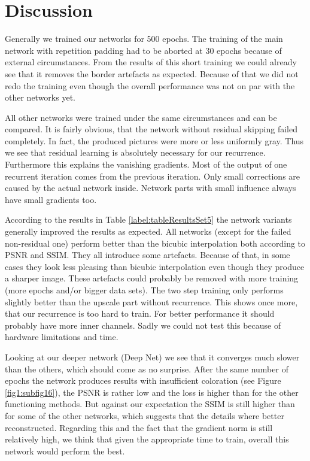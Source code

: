 \documentclass[11pt]{article}
\begin{document}
\clearpage
\section{Discussion}
Generally we trained our networks for 500 epochs. The training of the main network with repetition padding had to be aborted at 30 epochs because of external circumstances. From the results of this short training we could already see that it removes the border artefacts as expected. Because of that we did not redo the training even though the overall performance was not on par with the other networks yet.

All other networks were trained under the same circumstances and can be compared. It is fairly obvious, that the network without residual skipping failed completely. In fact, the produced pictures were more or less uniformly gray. Thus we see that residual learning is absolutely necessary for our recurrence. Furthermore this explains the vanishing gradients. Most of the output of one recurrent iteration comes from the previous iteration. Only small corrections are caused by the actual network inside. Network parts with small influence always have small gradients too.

According to the results in Table \ref{label:tableResultsSet5} the network variants generally improved the results as expected.
All networks (except for the failed non-residual one) perform better than the bicubic interpolation both according to PSNR and SSIM. They all introduce some artefacts. Because of that, in some cases they look less pleasing than bicubic interpolation even though they produce a sharper image. These artefacts could probably be removed with more training (more epochs and/or bigger data sets).
The two step training only performs slightly better than the upscale part without recurrence. This shows once more, that our recurrence is too hard to train. For better performance it should probably have more inner channels. Sadly we could not test this because of hardware limitations and time.

Looking at our deeper network (Deep Net) we see that it converges much slower than the others, which should come as no surprise. After the same number of epochs the network produces results with insufficient coloration (see Figure \ref{fig1:subfig16}), the PSNR is rather low and the loss is higher than for the other functioning methods. But against our expectation the SSIM is still higher than for some of the other networks, which suggests that the details where better reconstructed. Regarding this and the fact that the gradient norm is still relatively high, we think that given the appropriate time to train, overall this network would perform the best.
\end{document}
